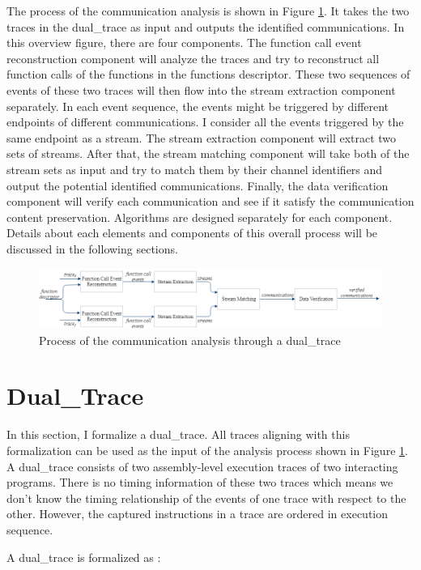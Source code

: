 \documentclass[12pt,oneside]{book}
\begin{document}
The process of the communication analysis is shown in Figure \ref{overview}. It takes the two traces in the dual\_trace as input and outputs the identified communications. In this overview figure, there are four components. The function call event reconstruction component will analyze the traces and try to reconstruct all function calls of the functions in the functions descriptor. These two sequences of events of these two traces will then flow into the stream extraction component separately. In each event sequence, the events might be triggered by different endpoints of different communications. I consider all the events triggered by the same endpoint as a stream. The stream extraction component will extract two sets of streams. After that, the stream matching component will take both of the stream sets as input and try to match them by their channel identifiers and output the potential identified communications. Finally, the data verification component will verify each communication and see if it satisfy the communication content preservation. Algorithms are designed separately for each component. Details about each elements and components of this overall process will be discussed in the following sections.


\begin{figure}[H]
\centerline{\includegraphics[scale=0.5]{Figures/overview}}
\caption{Process of the communication analysis through a dual\_trace}
\label{overview}
\end{figure}

\section{Dual\_Trace}\label{dualtrace}
In this section, I formalize a dual\_trace. All traces aligning with this formalization can be used as the input of the analysis process shown in Figure \ref{overview}. A dual\_trace consists of two assembly-level execution traces of two interacting programs. There is no timing information of these two traces which means we don't know the timing relationship of the events of one trace with respect to the other. However, the captured instructions in a trace are ordered in execution sequence. 

A dual\_trace is formalized as :
\end{document}
